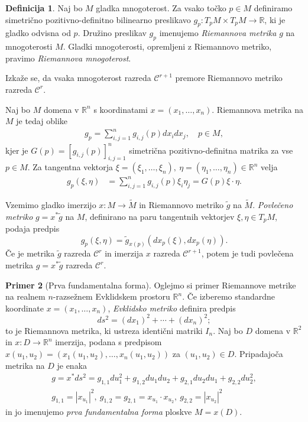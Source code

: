 \documentclass[12pt,a4paper,twoside]{article}
\theoremstyle{definition} %
\newtheorem{definicija}{Definicija}[section]
\newtheorem{primer}[definicija]{Primer}
\theoremstyle{plain} %
\numberwithin{equation}{section}  %
\newcommand{\R}{\mathbb R}
\begin{document}
\begin{definicija}
Naj bo $M$ gladka mnogoterost. Za vsako točko $p \in M$ definiramo simetrično pozitivno-definitno bilinearno preslikavo $g_{p} \colon T_{p}M \times T_{p}M \to \R$, ki je gladko odvisna od $p$. Družino preslikav $g_{p}$ imenujemo \emph{Riemannova metrika} $g$ na mnogoterosti $M$.
Gladki mnogoterosti, opremljeni z Riemannovo metriko, pravimo \emph{Riemannova mnogoterost}.
\end{definicija}

Izkaže se, da vsaka mnogoterost razreda $\mathcal{C}^{r+1}$ premore Riemannovo metriko razreda $\mathcal{C}^{r}$.

Naj bo $M$ domena v $\R^{n}$ s koordinatami $x = (x_{1}, \dots, x_{n})$. Riemannova metrika na $M$ je tedaj oblike
\begin{align}
g_{p} = \sum_{i,j=1}^{n} g_{i,j}(p) dx_{i} dx_{j}, \quad p \in M,
\end{align}
kjer je $G(p) = [g_{i,j}(p)]_{i,j=1}^{n}$ simetrična pozitivno-definitna matrika za vse $p \in M$. Za tangentna vektorja $\xi = (\xi_{1}, \dots, \xi_{n}), \ \eta = (\eta_{1}, \dots, \eta_{n}) \in \R^{n}$ velja
\begin{align}
g_{p}(\xi, \eta) &= \sum_{i,j=1}^{n} g_{i,j}(p) \xi_{i} \eta_{j} = G(p) \xi \cdot \eta.
\end{align}

Vzemimo gladko imerzijo $x \colon M \to \widetilde{M}$ in Riemannovo metriko $\tilde{g}$ na $\widetilde{M}$. \emph{Povlečeno metriko} $g = x^{*} \tilde{g}$ na $M$, definirano na paru tangentnih vektorjev $\xi, \eta \in T_{p}M$, podaja predpis
\begin{equation} \label{eq:pullback-metrika}
g_{p}(\xi, \eta) = \tilde{g}_{x(p)} (dx_{p}(\xi), dx_{p}(\eta)).
\end{equation}
Če je metrika $\tilde{g}$ razreda $\mathcal{C}^{r}$ in imerzija $x$ razreda $\mathcal{C}^{r+1}$, potem je tudi povlečena metrika $g = x^{*} \tilde{g}$ razreda $\mathcal{C}^{r}$.

\begin{primer}[Prva fundamentalna forma]
Oglejmo si primer Riemannove metrike na realnem $n$-razsežnem Evklidskem prostoru $\mathbb{R}^{n}$.
Če izberemo standardne koordinate $x = (x_{1}, \dots, x_{n})$, \emph{Evklidsko metriko} definira predpis
\begin{equation}
ds^2 = (dx_{1})^2 + \cdots + (dx_{n})^2;
\end{equation}
to je Riemannova metrika, ki ustreza identični matriki $I_{n}$. Naj bo $D$ domena v $\R^2$ in $x \colon D \to \R^{n}$ imerzija, podana s predpisom $x(u_1,u_2) = (x_{1}(u_1,u_2), \dots, x_{n}(u_1,u_2))$ za $(u_1,u_2) \in D$. Pripadajoča metrika na $D$ je enaka
\begin{gather}
g = x^{*}ds^2 = g_{1,1}du_{1}^2 + g_{1,2}du_{1}du_{2} + g_{2,1}du_{2}du_{1} + g_{2,2}du_{2}^2, \\
g_{1,1} = |x_{u_1}|^2, \ g_{1,2} = g_{2,1} = x_{u_1} \cdot x_{u_2}, \ g_{2,2} = |x_{u_2}|^2
\end{gather}
in jo imenujemo \emph{prva fundamentalna forma} ploskve $M = x(D)$.
\end{primer}
\end{document}
